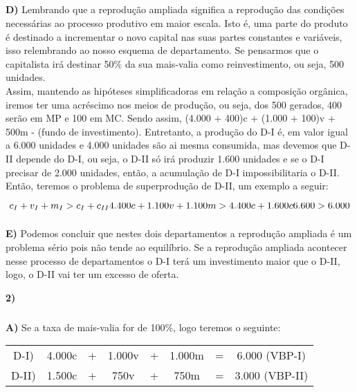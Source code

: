 \documentclass[a4paper, 12pt]{article} %
\begin{document}
\subparagraph{} \textbf{D)} Lembrando que a reprodução ampliada significa a reprodução das condições necessárias ao processo produtivo em maior escala. Isto é, uma parte do produto é destinado a incrementar o novo capital nas suas partes constantes e variáveis, isso relembrando ao nosso esquema de departamento. Se pensarmos que o capitalista irá destinar 50\% da sua mais-valia como reinvestimento, ou seja, 500 unidades.
\\
Assim, mantendo as hipóteses simplificadoras em relação a composição orgânica, iremos ter uma acréscimo nos meios de produção, ou seja, dos 500 gerados, 400 serão em MP e 100 em MC. Sendo assim, (4.000 + 400)c + (1.000 + 100)v + 500m - (fundo de investimento). Entretanto, a produção do D-I é, em valor igual a 6.000 unidades e 4.000 unidades são ai mesma consumida, mas devemos que D-II depende do D-I, ou seja, o D-II só irá produzir 1.600 unidades e se o D-I precisar de 2.000 unidades, então, a acumulação de D-I impossibilitaria o D-II.
\\
Então, teremos o problema de superprodução de D-II, um exemplo a seguir:

\begin{equation}
c_{I} + v_{I} + m_{I} > c_{I} + c_{II}
$$\\$$
4.400c + 1.100v + 1.100m > 4.400c + 1.600c
$$\\$$
6.600 > 6.000
\end{equation}

\subparagraph{} \textbf{E)} Podemos concluir que nestes dois departamentos a reprodução ampliada é um problema sério pois não tende ao equilíbrio. Se a reprodução ampliada acontecer nesse processo de departamentos o D-I terá um investimento maior que o D-II, logo, o D-II vai ter um excesso de oferta.

\vspace{0.5cm}

\par \textbf{2)} 

\subparagraph{} \textbf{A)} Se a taxa de mais-valia for de 100\%, logo teremos o seguinte:

\begin{center}
	\begin{tabular}{cccccccc}
		
		D-I) & 4.000c & + & 1.000v & + & 1.000m &=& 6.000 (VBP-I) \\
		D-II) & 1.500c & + & 750v & + & 750m &=& 3.000 (VBP-II)
	\end{tabular}
\end{center}
\end{document}
